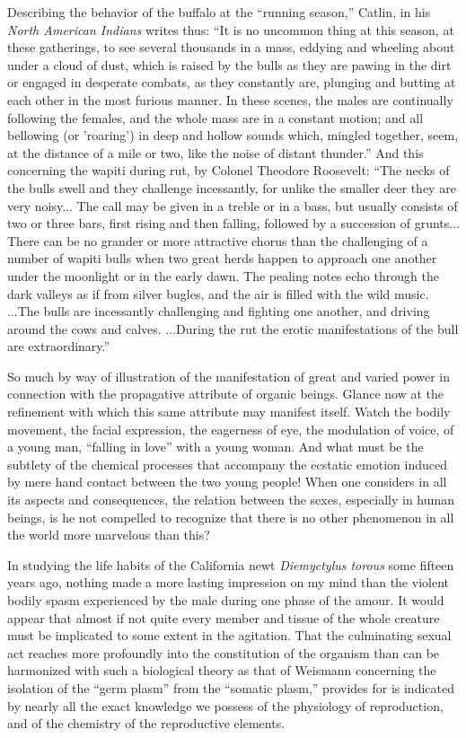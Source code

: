 \documentclass[a4paper, 11pt, oneside, polutonikogreek, english, landscape]{article}
\begin{document}
Describing the behavior of the buffalo at the ``running season,'' Catlin, in his \emph{North American Indians} writes thus: ``It is no uncommon thing at this season, at these gatherings, to see several thousands in a mass, eddying and wheeling about under a cloud of dust, which is raised by the bulls as they are pawing in the dirt or engaged in desperate combats, as they constantly are, plunging and butting at each other in the most furious manner. In these scenes, the males are continually following the females, and the whole mass are in a constant motion; and all bellowing (or 'roaring') in deep and hollow sounds which, mingled together, seem, at the distance of a mile or two, like the noise of distant thunder.'' And this concerning the wapiti during rut, by Colonel Theodore Roosevelt: ``The necks of the bulls swell and they challenge incessantly, for unlike the smaller deer they are very noisy... The call may be given in a treble or in a bass, but usually consists of two or three bars, first rising and then falling, followed by a succession of grunts... There can be no grander or more attractive chorus than the challenging of a number of wapiti bulls when two great herds happen to approach one another under the moonlight or in the early dawn. The pealing notes echo through the dark valleys as if from silver bugles, and the air is filled with the wild music. ...The bulls are incessantly challenging and fighting one another, and driving around the cows and calves. ...During the rut the erotic manifestations of the bull are extraordinary.''

So much by way of illustration of the manifestation of great and varied power in connection with the propagative attribute of organic beings. Glance now at the refinement with which this same attribute may manifest itself. Watch the bodily movement, the facial expression, the eagerness of eye, the modulation of voice, of a young man, ``falling in love'' with a young woman. And what must be the subtlety of the chemical processes that accompany the ecstatic emotion induced by mere hand contact between the two young people! When one considers in all its aspects and consequences, the relation between the sexes, especially in human beings, is he not compelled to recognize that there is no other phenomenon in all the world more marvelous than this?

In studying the life habits of the California newt \emph{Diemyctylus torous} some fifteen years ago, nothing made a more lasting impression on my mind than the violent bodily spasm experienced by the male during one phase of the amour. It would appear that almost if not quite every member and tissue of the whole creature must be implicated to some extent in the agitation. That the culminating sexual act reaches more profoundly into the constitution of the organism than can be harmonized with such a biological theory as that of Weismann concerning the isolation of the ``germ plasm'' from the ``somatic plasm,'' provides for is indicated by nearly all the exact knowledge we possess of the physiology of reproduction, and of the chemistry of the reproductive elements.
\end{document}
